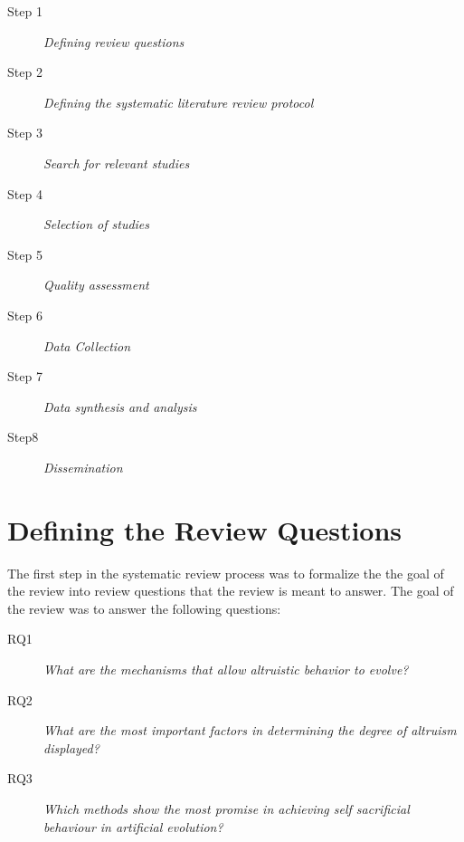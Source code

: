 \documentclass[a4paper]{book}
\begin{document}
\begin{description}
\item[Step 1] {\it Defining review questions}

\item[Step 2] {\it Defining the systematic literature review protocol}

\item[Step 3] {\it Search for relevant studies}

\item[Step 4] {\it Selection of studies}

\item[Step 5] {\it Quality assessment}

\item[Step 6] {\it Data Collection}

\item[Step 7] {\it Data synthesis and analysis}

\item[Step8] {\it Dissemination}

\end{description}

\clearpage 

\section{Defining the Review Questions}
The first step in the systematic review process was to formalize the the goal of the review into review questions that the review is meant to answer. The goal of the review was to answer the following questions:

\begin{description}
\item[RQ1] {\it What are the mechanisms that allow altruistic behavior to evolve?} 
\item[RQ2] {\it What are the most important factors in determining the degree of altruism displayed?}
\item[RQ3] {\it Which methods show the most promise in achieving self sacrificial behaviour in artificial evolution?}

\end{description}


\end{document}
